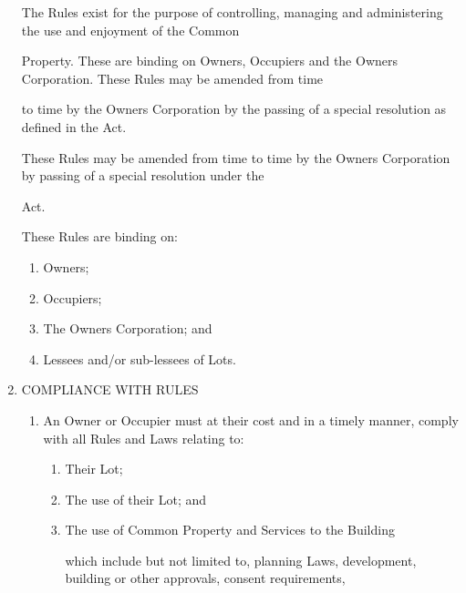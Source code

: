 \documentclass{article}
\begin{document}
\begin{enumerate}[label=\arabic*.]
{\fontsize{10.02}{1}The Rules exist for the purpose of controlling, managing and administering the use and enjoyment of the Common }

{\fontsize{10.02}{1}Property. These are binding on Owners, Occupiers and the Owners Corporation. These Rules may be amended from time }

{\fontsize{10.02}{1}to time by the Owners Corporation by the passing of a special resolution as defined in the Act. }

{\fontsize{10.02}{1}These Rules may be amended from time to time by the Owners Corporation by passing of a special resolution under the }

{\fontsize{10.02}{1}Act. }

{\fontsize{10.02}{1}These Rules are binding on: }

\begin{enumerate}[label=(\arabic*)]
\item {\fontsize{9.962}{1} Owners; }

\item {\fontsize{9.962}{1} Occupiers; }

\item {\fontsize{9.962}{1} The Owners Corporation; and }

\item {\fontsize{9.962}{1} Lessees and/or sub-lessees of Lots. }

\end{enumerate}
\item {\fontsize{9.99}{1} COMPLIANCE WITH RULES }

\begin{enumerate}[label=\arabic{enumi}.\arabic*.]
\item {\fontsize{9.99}{1} An Owner or Occupier must at their cost and in a timely manner, comply with all Rules and Laws relating to: }

\begin{enumerate}[label=(\arabic*)]
\item {\fontsize{9.962}{1} Their Lot; }

\item {\fontsize{9.962}{1} The use of their Lot; and }

\item {\fontsize{9.962}{1} The use of Common Property and Services to the Building }

{\fontsize{10.02}{1}which include but not limited to, planning Laws, development, building or other approvals, consent requirements, }


\end{enumerate}
\end{enumerate}
\end{enumerate}
\end{document}
